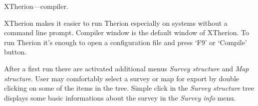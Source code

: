\subsubchapter XTherion---compiler.

XTherion makes it easier to run Therion especially on systems without a command 
line prompt. Compiler window is the default window of XTherion. To run Therion 
it's enough to open a configuration file and press `F9' or `Compile' button. 

After a first run there are activated additional menus {\it Survey 
structure} and {\it Map structure}. User may comfortably select a survey or map 
for export by double clicking on some of the items in the tree. Simple click in 
the {\it Survey structure} tree displays some basic informations about the 
survey in the {\it Survey info} menu.

\endinput
